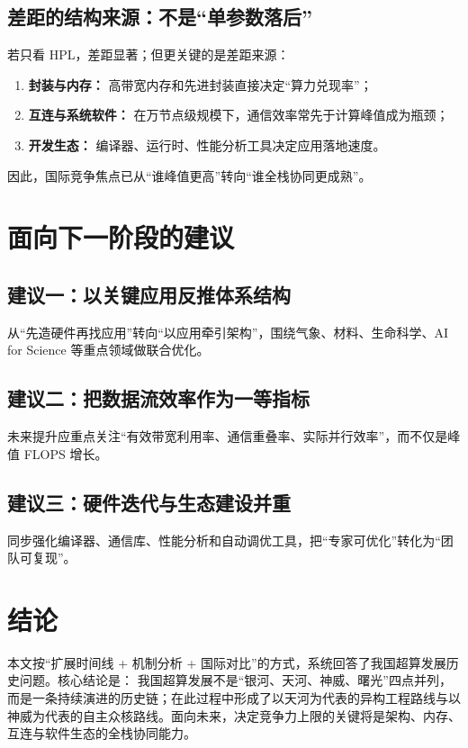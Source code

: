 \documentclass[12pt,a4paper]{article}
\begin{document}
\subsection{差距的结构来源：不是“单参数落后”}
若只看 HPL，差距显著；但更关键的是差距来源：
\begin{enumerate}[leftmargin=2.5em]
  \item \textbf{封装与内存：} 高带宽内存和先进封装直接决定“算力兑现率”；
  \item \textbf{互连与系统软件：} 在万节点级规模下，通信效率常先于计算峰值成为瓶颈；
  \item \textbf{开发生态：} 编译器、运行时、性能分析工具决定应用落地速度。
\end{enumerate}
因此，国际竞争焦点已从“谁峰值更高”转向“谁全栈协同更成熟”。

\section{面向下一阶段的建议}
\subsection{建议一：以关键应用反推体系结构}
从“先造硬件再找应用”转向“以应用牵引架构”，围绕气象、材料、生命科学、AI for Science 等重点领域做联合优化。

\subsection{建议二：把数据流效率作为一等指标}
未来提升应重点关注“有效带宽利用率、通信重叠率、实际并行效率”，而不仅是峰值 FLOPS 增长。

\subsection{建议三：硬件迭代与生态建设并重}
同步强化编译器、通信库、性能分析和自动调优工具，把“专家可优化”转化为“团队可复现”。

\section{结论}
本文按“扩展时间线 + 机制分析 + 国际对比”的方式，系统回答了我国超算发展历史问题。核心结论是：  
我国超算发展不是“银河、天河、神威、曙光”四点并列，而是一条持续演进的历史链；在此过程中形成了以天河为代表的异构工程路线与以神威为代表的自主众核路线。面向未来，决定竞争力上限的关键将是架构、内存、互连与软件生态的全栈协同能力。



\end{document}
